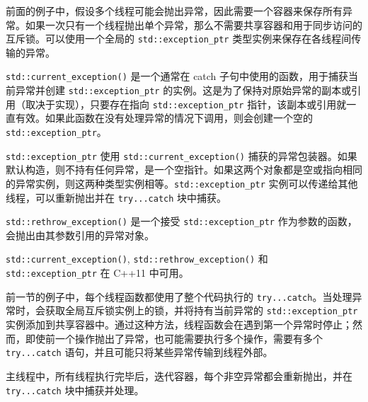
前面的例子中，假设多个线程可能会抛出异常，因此需要一个容器来保存所有异常。如果一次只有一个线程抛出单个异常，那么不需要共享容器和用于同步访问的互斥锁。可以使用一个全局的 \verb|std::exception_ptr| 类型实例来保存在各线程间传输的异常。

\verb|std::current_exception()| 是一个通常在 catch 子句中使用的函数，用于捕获当前异常并创建 \verb|std::exception_ptr| 的实例。这是为了保持对原始异常的副本或引用（取决于实现），只要存在指向 \verb|std::exception_ptr| 指针，该副本或引用就一直有效。如果此函数在没有处理异常的情况下调用，则会创建一个空的 \verb|std::exception_ptr|。

\verb|std::exception_ptr| 使用 \verb|std::current_exception()| 捕获的异常包装器。如果默认构造，则不持有任何异常，是一个空指针。如果这两个对象都是空或指向相同的异常实例，则这两种类型实例相等。\verb|std::exception_ptr| 实例可以传递给其他线程，可以重新抛出并在 \verb|try...catch| 块中捕获。

\verb|std::rethrow_exception()| 是一个接受 \verb|std::exception_ptr| 作为参数的函数，会抛出由其参数引用的异常对象。

\begin{myNotic}
\verb|std::current_exception()|, \verb|std::rethrow_exception()| 和 \verb|std::exception_ptr| 在 C++11 中可用。
\end{myNotic}

前一节的例子中，每个线程函数都使用了整个代码执行的 \verb|try...catch|。当处理异常时，会获取全局互斥锁实例上的锁，并将持有当前异常的 \verb|std::exception_ptr| 实例添加到共享容器中。通过这种方法，线程函数会在遇到第一个异常时停止；然而，即使前一个操作抛出了异常，也可能需要执行多个操作，需要有多个 \verb|try...catch| 语句，并且可能只将某些异常传输到线程外部。

主线程中，所有线程执行完毕后，迭代容器，每个非空异常都会重新抛出，并在 \verb|try...catch| 块中捕获并处理。









